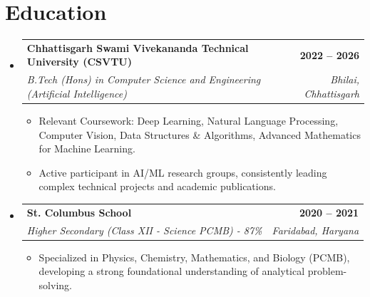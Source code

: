 \documentclass[letterpaper,10.5pt]{article}
\makeatletter
\newcommand{\resumeItem}[1]{\item\small{{#1 \vspace{-2pt}}}}
\newcommand{\resumeSubheading}[4]{
  \vspace{-1pt}\item
    \begin{tabular*}{0.97\textwidth}[t]{l@{\extracolsep{\fill}}r}
      \textbf{#1} & \color{greenTheme}\textbf{#2} \\
      \textit{\small#3} & \textit{\small\color{lightGray} #4} \\
    \end{tabular*}\vspace{-6pt}
}
\newcommand{\resumeSubHeadingListStart}{\begin{itemize}[leftmargin=0.15in, label={}]}
\newcommand{\resumeSubHeadingListEnd}{\end{itemize}}
\newcommand{\resumeItemListStart}{\begin{itemize}}
\newcommand{\resumeItemListEnd}{\end{itemize}\vspace{-5pt}}
\makeatother
\begin{document}
\section{Education}
\resumeSubHeadingListStart
\resumeSubheading{Chhattisgarh Swami Vivekananda Technical University (CSVTU)}{2022 -- 2026}{B.Tech (Hons) in Computer Science and Engineering (Artificial Intelligence)}{Bhilai, Chhattisgarh}
  \resumeItemListStart
    \resumeItem{Relevant Coursework: Deep Learning, Natural Language Processing, Computer Vision, Data Structures \& Algorithms, Advanced Mathematics for Machine Learning.}
    \resumeItem{Active participant in AI/ML research groups, consistently leading complex technical projects and academic publications.}
  \resumeItemListEnd
\resumeSubHeadingListEnd

\resumeSubHeadingListStart
\resumeSubheading{St. Columbus School}{2020 -- 2021}{Higher Secondary (Class XII - Science PCMB) - 87\%}{Faridabad, Haryana}
  \resumeItemListStart
    \resumeItem{Specialized in Physics, Chemistry, Mathematics, and Biology (PCMB), developing a strong foundational understanding of analytical problem-solving.}
  \resumeItemListEnd
\resumeSubHeadingListEnd
\end{document}
